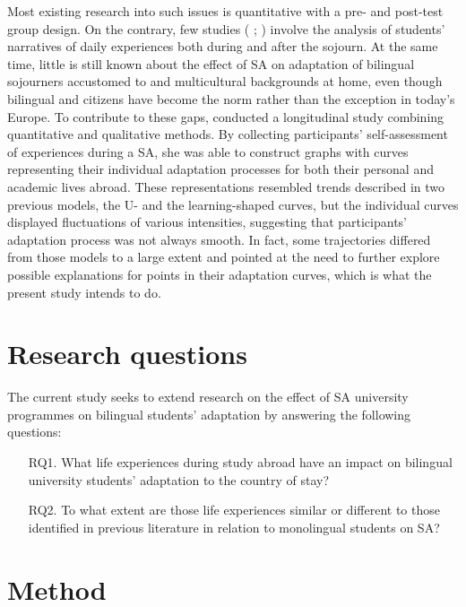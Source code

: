 \documentclass[output=paper]{langsci/langscibook}
\begin{document}
Most existing research into such issues is quantitative with a pre- and post-test group design. On the contrary, few studies (\citeauthor{Jackson2008b} \citeyear*{Jackson2008b}; \citealt{BownEtAl2015,Campbell2015,Plews2015}) involve the analysis of students’ narratives of daily experiences both during and after the sojourn. At the same time, little is still known about the effect of SA on  adaptation of bilingual sojourners accustomed to  and multicultural backgrounds at home, even though bilingual and  citizens have become the norm rather than the exception in today’s Europe. To contribute to these gaps, \citet{Pogorelova2016} conducted a longitudinal study combining quantitative and qualitative methods. By collecting participants’ self-assessment of experiences during a SA, she was able to construct graphs with curves representing their individual adaptation processes for both their personal and academic lives abroad. These representations resembled trends described in two previous models, the U- and the learning-shaped curves, but the individual curves displayed fluctuations of various intensities, suggesting that participants’ adaptation process was not always smooth. In fact, some trajectories differed from those models to a large extent and pointed at the need to further explore possible explanations for  points in their adaptation curves, which is what the present study intends to do.  


\section{Research questions}

The current study seeks to extend research on the effect of SA university programmes on bilingual students’  adaptation by answering the following questions: 

\begin{itemize}
\item[RQ1.] What life experiences during study abroad have an impact on bilingual university students’  adaptation to the country of stay?
\item[RQ2.] To what extent are those life experiences similar or different to those identified in previous literature in relation to monolingual students on SA?
\end{itemize}

\section{Method}
\end{document}
